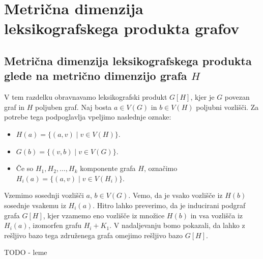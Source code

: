 \documentclass[mat1, tisk]{fmfdelo}
\newcommand{\1}{(1, 1, \ldots, 1)}
\newcommand{\2}{(2, 2, \ldots, 2)}
\begin{document}
\section{Metrična dimenzija leksikografskega produkta grafov}\label{s:mdim_prod}
 



\subsection{Metrična dimenzija leksikografskega produkta glede na metrično 
dimenzijo grafa $H$} \label{ss:mdim_komp_prod}

V tem razdelku obravnavamo leksikografski produkt $G[H]$, kjer je $G$ povezan graf in $H$ 
poljuben graf. Naj bosta $a \in V(G)$ in $b \in V(H)$ poljubni vozlišči. Za potrebe tega 
podpoglavlja vpeljimo naslednje oznake:
\begin{itemize}
    \item $H(a) = \{ (a, v) \; | \; v \in V(H) \}$.
    \item $G(b) = \{ (v, b) \; | \; v \in V(G) \}$.
    \item Če so $H_1, H_2, \ldots , H_k$ komponente grafa $H$, označimo 
    $H_i(a) = \{ (a, v) \; | \; v \in V(H_i) \}$.
\end{itemize}

Vzemimo sosednji vozlišči $a$, $b \in V(G)$. Vemo, da je vsako vozlišče iz $H(b)$ 
sosednje vsakemu iz $H_i(a).$ 
Hitro lahko preverimo, da je inducirani podgraf grafa $G[H]$, kjer vzamemo eno 
vozlišče iz množice $H(b)$ in vsa vozlišča iz $H_i(a)$, izomorfen grafu $H_i + K_1.$ 
V nadaljevanju bomo pokazali, da lahko z rešljivo bazo tega združenega grafa
omejimo rešljivo bazo $G[H]$.

TODO - leme


        
\end{document}
